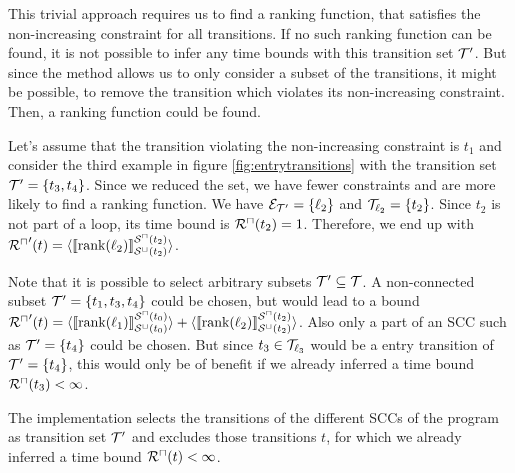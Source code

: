 This trivial approach requires us to find a ranking function, that satisfies the non-increasing constraint for all transitions.
If no such ranking function can be found, it is not possible to infer any time bounds with this transition set $\mathcal{T}'$.
But since the method allows us to only consider a subset of the transitions, it might be possible, to remove the transition which violates its non-increasing constraint.
Then, a ranking function could be found.

Let's assume that the transition violating the non-increasing constraint is $t_1$ and consider the third example in figure \ref{fig:entrytransitions} with the transition set $\mathcal{T}' = \lbrace t_3, t_4 \rbrace$.
Since we reduced the set, we have fewer constraints and are more likely to find a ranking function.
We have $\mathcal{E}_{\mathcal{T}'} = \lbrace \ell_2 \rbrace$ and $\mathcal{T}_{\ell_2} = \lbrace t_2 \rbrace$.
Since $t_2$ is not part of a loop, its time bound is ${\mathcal{R}^\sqcap}(t_2) = 1$.
Therefore, we end up with ${\mathcal{R}^\sqcap}'(t) = \langle\llbracket \text{rank}(\ell_2) \rrbracket_{{\mathcal{S}^\sqcup}(t_2)}^{{\mathcal{S}^\sqcap}(t_2)}\rangle$.

Note that it is possible to select arbitrary subsets $\mathcal{T}' \subseteq \mathcal{T}$.
A non-connected subset $\mathcal{T}' = \lbrace t_1, t_3, t_4 \rbrace$ could be chosen, but would lead to a bound ${\mathcal{R}^\sqcap}'(t) = \langle\llbracket \text{rank}(\ell_1) \rrbracket_{{\mathcal{S}^\sqcup}(t_0)}^{{\mathcal{S}^\sqcap}(t_0)}\rangle + \langle\llbracket \text{rank}(\ell_2) \rrbracket_{{\mathcal{S}^\sqcup}(t_2)}^{{\mathcal{S}^\sqcap}(t_2)}\rangle$.
Also only a part of an SCC such as $\mathcal{T}' = \lbrace t_4 \rbrace$ could be chosen.
But since $t_3 \in \mathcal{T}_{\ell_3}$ would be a entry transition of $\mathcal{T}' = \lbrace t_4 \rbrace$, this would only be of benefit if we already inferred a time bound ${\mathcal{R}^\sqcap}(t_3) < \infty$.

The implementation selects the transitions of the different SCCs of the program as transition set $\mathcal{T}'$ and excludes those transitions $t$, for which we already inferred a time bound ${\mathcal{R}^\sqcap}(t) < \infty$.
